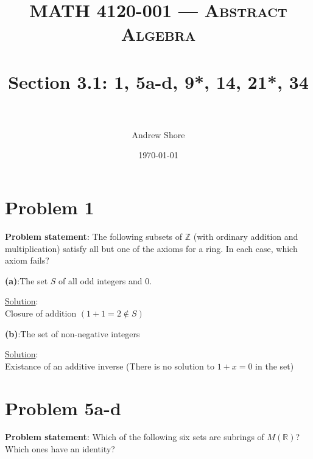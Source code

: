 \documentclass{article} %
\title{ 
\normalfont \normalsize 
\textsc{MATH 4120-001 --- Abstract Algebra} \\
\horrule{0.5pt} \\[0cm] %
\huge Section 3.1: 1, 5a-d, 9*, 14, 21*, 34 \\ %
\horrule{2pt} \\[0cm] %
}
\author{Andrew Shore} %
\date{\normalsize\today} %
\begin{document}
\maketitle %

\section*{Problem 1}


\textbf{Problem statement}: The following subsets of $\mathbb{Z}$ (with ordinary addition and multiplication) satisfy all but one of the axioms for a ring.  In each case, which axiom fails?
\\

\begin{addmargin}[1em]{0em}

\textbf{(a)}:The set $S$ of all odd integers and 0.
\begin{addmargin}[1em]{0em}
\underline{Solution}: \\
Closure of addition $(1 + 1 = 2 \not\in S)$
\begin{addmargin}[1em]{0em}
\end{addmargin}
\end{addmargin}   

\textbf{(b)}:The set of non-negative integers
\begin{addmargin}[1em]{0em}
\underline{Solution}: \\
Existance of an additive inverse (There is no solution to $1 + x = 0$ in the set)
\begin{addmargin}[1em]{0em}
\end{addmargin}
\end{addmargin}
 
\end{addmargin}

\newpage

\section*{Problem 5a-d}

\textbf{Problem statement}: Which of the following six sets are subrings of $M(\mathbb{R})$? Which ones have an identity?
\\
\end{document}
